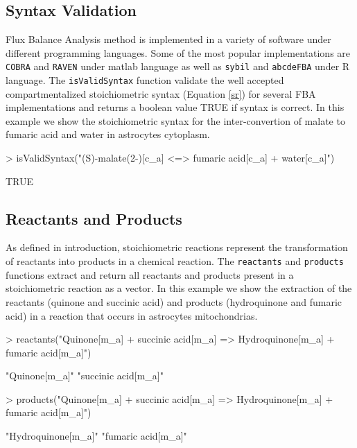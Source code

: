 \subsection*{Syntax Validation}
Flux Balance Analysis method is implemented in a variety of software under different programming languages. Some of the most popular implementations are \texttt{COBRA} \cite{Becker2007} and \texttt{RAVEN} \cite{Agren2013} under matlab language as well as \texttt{sybil} and \texttt{abcdeFBA} under R language. The \texttt{\mbox{isValidSyntax}} function validate the well accepted compartmentalized stoichiometric syntax (Equation \ref{sr}) for several FBA implementations and returns a boolean value TRUE if syntax is correct. In this example we show the stoichiometric syntax for the inter-convertion of  malate to fumaric acid and water in astrocytes cytoplasm.
\begin{Schunk}
\begin{Sinput}
> isValidSyntax("(S)-malate(2-)[c_a] <=> fumaric acid[c_a] + water[c_a]")
\end{Sinput}
\begin{Soutput}
[1] TRUE
\end{Soutput}
\end{Schunk}
\subsection*{Reactants and Products}
As defined in introduction, stoichiometric reactions represent the transformation of reactants into products in a chemical reaction. The \texttt{reactants} and \texttt{products} functions extract and return all reactants and products present in a stoichiometric reaction  as a vector. In this example we show the extraction of the reactants (quinone and succinic acid) and products (hydroquinone and fumaric acid) in a reaction that occurs in astrocytes mitochondrias.
\begin{Schunk}
\begin{Sinput}
> reactants("Quinone[m_a] + succinic acid[m_a] => Hydroquinone[m_a] + fumaric acid[m_a]")
\end{Sinput}
\begin{Soutput}
[1] "Quinone[m_a]"       "succinic acid[m_a]"
\end{Soutput}
\begin{Sinput}
> products("Quinone[m_a] + succinic acid[m_a] => Hydroquinone[m_a] + fumaric acid[m_a]")
\end{Sinput}
\begin{Soutput}
[1] "Hydroquinone[m_a]" "fumaric acid[m_a]"
\end{Soutput}
\end{Schunk}

